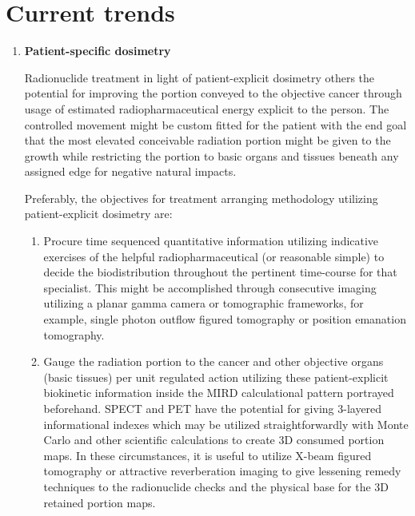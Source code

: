 \documentclass[12pt]{article}
\begin{document}
\section{Current trends}
\begin{enumerate}
\item \textbf{Patient-specific dosimetry} \par Radionuclide treatment in light of patient-explicit dosimetry others the potential for improving the portion conveyed to the objective cancer through usage of estimated radiopharmaceutical energy explicit to the person. The controlled movement might be custom fitted for the patient with the end goal that the most elevated conceivable radiation portion might be given to the growth while restricting the portion to basic organs and tissues beneath any assigned edge for negative natural impacts. \par Preferably, the objectives for treatment arranging methodology utilizing patient-explicit dosimetry are: \par
	\begin{enumerate}
		\item Procure time sequenced quantitative information utilizing indicative exercises of the helpful radiopharmaceutical (or reasonable simple) to decide 			the biodistribution throughout the pertinent time-course for that specialist. This might be accomplished through consecutive imaging utilizing a 					planar gamma camera or tomographic frameworks, for example, single photon outflow figured tomography or position emanation tomography. 
		\item	Gauge the radiation portion to the cancer and other objective organs (basic tissues) per unit regulated action utilizing these patient-explicit 						biokinetic information inside the MIRD calculational pattern portrayed beforehand. SPECT and PET have the potential for giving 3-layered 						informational indexes which may be utilized straightforwardly with Monte Carlo and other scientific calculations to create 3D consumed portion 					maps. In these circumstances, it is useful to utilize X-beam figured tomography or attractive reverberation imaging to give lessening remedy 					techniques to the radionuclide checks and the physical base for the 3D retained portion maps.	
		\par

\end{enumerate}
\end{enumerate}
\end{document}
